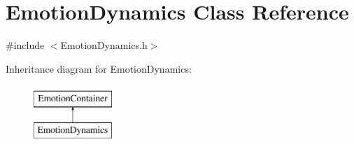 \hypertarget{class_emotion_dynamics}{
\section{\-Emotion\-Dynamics \-Class \-Reference}
\label{class_emotion_dynamics}
}


{\ttfamily \#include $<$\-Emotion\-Dynamics.\-h$>$}

\-Inheritance diagram for \-Emotion\-Dynamics\-:\begin{figure}[H]
\begin{center}
\leavevmode
\includegraphics[height=2.000000cm]{class_emotion_dynamics}
\end{center}
\end{figure}
